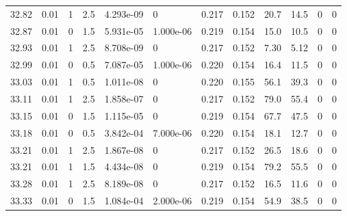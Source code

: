 \documentclass[preview]{standalone}
\begin{document}
{{{{{{{{{{{{{{{\begin{tabular}{L{1.2cm}C{1.2cm} C{0.3cm}C{0.5cm} C{1.4cm}C{1.4cm} C{1.4cm}C{1.4cm} C{1.6cm}C{1.6cm} C{1.6cm}C{1.6cm}}
  32.82  &  0.01  & 1     & 2.5 &  4.293e-09  & 0  &  0.217&   0.152& 20.7 & 14.5   &  0 & 0  \\ 
  32.87  &  0.01  & 0     & 1.5 &  5.931e-05  & 1.000e-06  &  0.219&   0.154& 15.0 & 10.5   &  0 & 0  \\ 
  32.93  &  0.01  & 1     & 2.5 &  8.708e-09  & 0  &  0.217&   0.152& 7.30 & 5.12   &  0 & 0  \\ 
  32.99  &  0.01  & 0     & 0.5 &  7.087e-05  & 1.000e-06  &  0.220&   0.154& 16.4 & 11.5   &  0 & 0  \\ 
  33.03  &  0.01  & 1     & 0.5 &  1.011e-08  & 0  &  0.220&   0.155& 56.1 & 39.3   &  0 & 0  \\ 
  33.11  &  0.01  & 1     & 2.5 &  1.858e-07  & 0  &  0.217&   0.152& 79.0 & 55.4   &  0 & 0  \\ 
  33.15  &  0.01  & 0     & 1.5 &  1.115e-05  & 0  &  0.219&   0.154& 67.7 & 47.5   &  0 & 0  \\ 
  33.18  &  0.01  & 0     & 0.5 &  3.842e-04  & 7.000e-06  &  0.220&   0.154& 18.1 & 12.7   &  0 & 0  \\ 
  33.21  &  0.01  & 1     & 2.5 &  1.867e-08  & 0  &  0.217&   0.152& 26.5 & 18.6   &  0 & 0  \\ 
  33.21  &  0.01  & 1     & 1.5 &  4.434e-08  & 0  &  0.219&   0.154& 79.2 & 55.5   &  0 & 0  \\ 
  33.28  &  0.01  & 1     & 2.5 &  8.189e-08  & 0  &  0.217&   0.152& 16.5 & 11.6   &  0 & 0  \\ 
  33.33  &  0.01  & 0     & 1.5 &  1.084e-04  & 2.000e-06  &  0.219&   0.154& 54.9 & 38.5   &  0 & 0  \\ 
\hline 
\end{tabular} 

}}}}}}}}}}}}}}}
\end{document}

